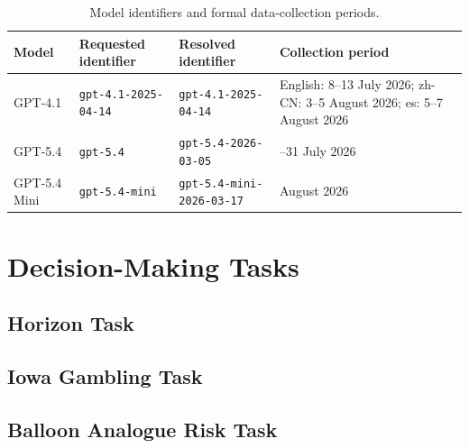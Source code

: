 \documentclass[logo,msc]{infthesis}           %
\begin{document}
\begin{table}[htbp]
    \centering
    \caption{Model identifiers and formal data-collection periods.}
    \label{tab:model_identifiers}
    \begin{tabularx}{\textwidth}{
        >{\raggedright\arraybackslash}p{2.3cm}
        >{\raggedright\arraybackslash}X
        >{\raggedright\arraybackslash}X
        >{\raggedright\arraybackslash}p{2.8cm}
    }
        \toprule
        \textbf{Model} &
        \textbf{Requested identifier} &
        \textbf{Resolved identifier} &
        \textbf{Collection period} \\
        \midrule
        GPT-4.1
        & \texttt{gpt-4.1-2025-04-14}
        & \texttt{gpt-4.1-2025-04-14}
        & English: 8--13 July 2026; zh-CN: 3--5 August 2026; es: 5--7 August 2026 \\

        GPT-5.4
        & \texttt{gpt-5.4}
        & \texttt{gpt-5.4-2026-03-05}
        & 30--31 July 2026 \\

        GPT-5.4 Mini
        & \texttt{gpt-5.4-mini}
        & \texttt{gpt-5.4-mini-2026-03-17}
        & 1 August 2026 \\
        \bottomrule
    \end{tabularx}
\end{table}

\hypertarget{decision-making-tasks}{%
\section{Decision-Making Tasks}\label{decision-making-tasks}}

\hypertarget{horizon-task}{%
\subsection{Horizon Task}\label{horizon-task}}

\hypertarget{iowa-gambling-task}{%
\subsection{Iowa Gambling Task}\label{iowa-gambling-task}}

\hypertarget{balloon-analogue-risk-task}{%
\subsection{Balloon Analogue Risk Task}\label{balloon-analogue-risk-task}}
\end{document}
